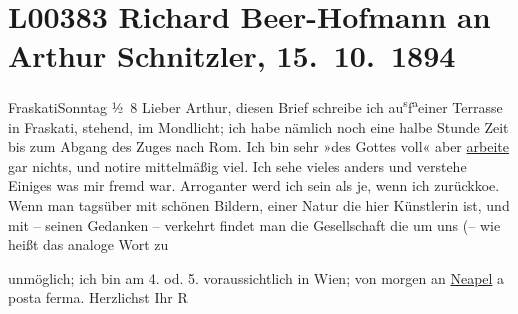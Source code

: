 

\section[Richard Beer-Hofmann an Arthur Schnitzler, 15. 10. 1894]{L00383 Richard Beer-Hofmann an Arthur Schnitzler, 15. 10. 1894}
\nopagebreak{}
\rehead{ }\normalsize\beginnumbering{}
\toendnotes[C]{\smallbreak\pagebreak[2]}
\toendnotes[C]{\smallbreak}
\pstart
           \raggedleft{}{\pb}FraskatiSonntag{ }½ 8\pend
           \vspace{0.5em}
\pstart
           {\pb}Lieber Arthur, diesen Brief schreibe ich au\substVorne{}\textsuperscript{s}\substDazwischen{}f\substHinten{}{ }\substVorne{}\textsuperscript{a}\substDazwischen{}e\substHinten{}iner Terrasse  in Fraskati, stehend, im Mondlicht; ich habe nämlich noch eine
               halbe Stunde Zeit bis zum Abgang des Zuges nach Rom. {\pb}Ich bin sehr »des Gottes voll« aber \uline{arbeite} gar nichts, und notire mittelmäßig viel. Ich
               sehe vieles anders und verstehe Einiges was mir fremd war. Arroganter werd ich {\pb}sein als je, wenn ich zurückko{\geminationm}e. Wenn man tagsüber mit schönen Bildern, einer Natur
               die hier Künstlerin ist, und mit – seinen Gedanken – verkehrt {\pb}findet man die Gesellschaft die um
               uns (– wie heißt das analoge Wort zu\pend
           \settowidth{\longeste}{}\settowidth{\longestz}{}\settowidth{\longestd}{}\settowidth{\longestv}{}\settowidth{\longestf}{}\addtolength\longeste{1em}
        \addtolength\longestz{1em}
      
\pstart
           unmöglich; ich bin am 4. od. 5. voraussichtlich in Wien; von morgen an \uline{Neapel} a posta ferma.\pend
           \pstart Herzlichst Ihr \spacefill\mbox{R}\pend{}\endnumbering{}  
      